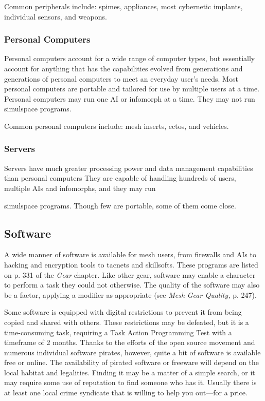 Common peripherals include: spimes, appliances, most cybernetic implants, individual sensors, and weapons. 

\subsubsection{Personal Computers} 

Personal computers account for a wide range of computer types, but essentially account for anything that has the capabilities evolved from generations and generations of personal computers to meet an everyday user's needs. Most personal computers are portable and tailored for use by multiple users at a time. Personal computers may run one AI or infomorph at a time. They may not run simulspace programs. 

Common personal computers include: mesh inserts, ectos, and vehicles. 

\subsubsection{Servers} 

Servers have much greater processing power and data management capabilities than personal computers They are capable of handling hundreds of users, multiple AIs and infomorphs, and they may run 

simulspace programs. Though few are portable, some of them come close. 

\subsection{Software} 

A wide manner of software is available for mesh users, from firewalls and AIs to hacking and encryption tools to tacnets and skillsofts. These programs are listed on p. 331 of the \textit{Gear }chapter. Like other gear, software may enable a character to perform a task they could not otherwise. The quality of the software may also be a factor, applying a modifier as appropriate (see \textit{Mesh } \textit{Gear Quality,} p. 247). 

Some software is equipped with digital restrictions to prevent it from being copied and shared with others. These restrictions may be defeated, but it is a time-consuming task, requiring a Task Action Programming Test with a timeframe of 2 months. Thanks to the efforts of the open source movement and numerous individual software pirates, however, quite a bit of software is available free or online. The availability of pirated software or freeware will depend on the local habitat and legalities. Finding it may be a matter of a simple search, or it may require some use of reputation to find someone who has it. Usually there is at least one local crime syndicate that is willing to help you out—for a price. 

